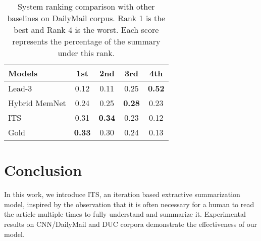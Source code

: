 \documentclass[11pt,a4paper]{article}
\begin{document}
\begin{table}[t!]
	\setlength{\abovecaptionskip}{0.cm}
	
	\setlength{\belowcaptionskip}{-0.cm}
	\begin{center}
		\begin{tabular}{l|cccc}
			\hline Models &  1st &  2nd &  3rd & 4th\\ 
			\hline
			Lead-3 & 0.12 &0.11 & 0.25 & \bf 0.52\\
			Hybrid MemNet& 0.24 &0.25 &\bf 0.28 & 0.23\\
			ITS & 0.31 &\bf 0.34 & 0.23 & 0.12\\
			Gold & \bf0.33 &0.30 & 0.24 & 0.13\\
			\hline
		\end{tabular}
	\end{center}
	\caption{\label{tab:model} System ranking comparison with other baselines on DailyMail corpus. Rank 1 is the best and Rank 4 is the worst. Each score represents the percentage of the summary under this rank.}
\end{table}







 
\section{Conclusion}
In this work, we introduce ITS, an iteration based extractive summarization model, inspired by the observation that it is often necessary for a human to read the article multiple times to fully understand and summarize it. 
Experimental results on CNN/DailyMail and DUC corpora demonstrate the effectiveness of our model.
\end{document}
